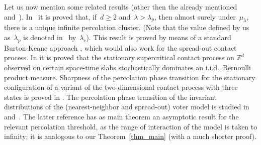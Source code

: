 \documentclass[a4paper,12pt]{article}
\begin{document}
\medskip



Let us now mention some related results (other then the already mentioned~\cite{LS06} and~\cite{rob_sharp}). In~\cite{vB20} it is proved that, if~$d \ge 2$ and~$\lambda > \lambda_p$, then almost surely under~$\mu_\lambda$, there is a unique infinite percolation cluster. (Note that the value defined by us as~$\lambda_p$ is denoted in~\cite{vB20} by~$\lambda_c$). This result is proved by means of a standard Burton-Keane approach \cite{bk89}, which would also work for the spread-out contact process. In \cite[Theorem 1.5]{rob_stein} it is proved that the stationary
 supercritical contact process on $\mathbb{Z}^d$ observed on certain space-time slabs stochastically dominates an i.i.d.\ Bernoulli product measure.
 Sharpness of the percolation phase transition for the stationary configuration of a variant of the two-dimensional contact process with three states is proved in \cite{markus_jakob_rob_sharp}. The percolation phase transition of the invariant distributions of the (nearest-neighbor and spread-out) voter model is studied in~\cite{RV15} and~\cite{RV17}. The latter reference has as main theorem an asymptotic result for the relevant percolation threshold, as the range of interaction of the model is taken to infinity; it is analogous to our Theorem~\ref{thm_main} (with a much shorter proof).\medskip
\end{document}

